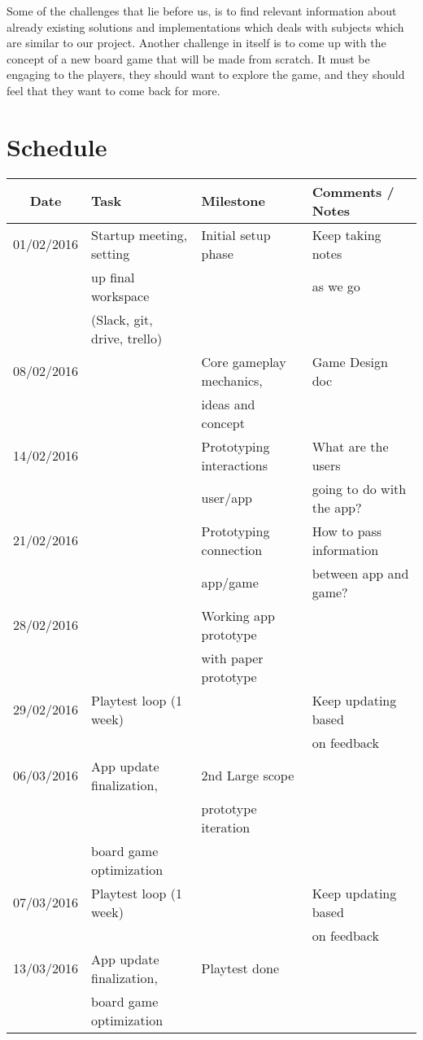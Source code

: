 \documentclass[a4paper,11pt]{article}
\begin{document}
Some of the challenges that lie before us, is to find relevant information about already existing solutions and implementations which deals with subjects which are similar to our project. 
Another challenge in itself is to come up with the concept of a new board game that will be made from scratch. It must be engaging to the players, they should want to explore the game, and they should feel that they want to come back for more.

\section{Schedule}
\begin{tabular}{|c|l|l|l|}
\hline
Date & Task & Milestone & Comments / Notes\\
\hline
01/02/2016 & Startup meeting, setting & Initial setup phase & Keep taking notes\\
& up final workspace &  &  as we go\\
& (Slack, git, drive, trello) & & \\
\hline
08/02/2016 & & Core gameplay mechanics,& Game Design doc \\
 & &  ideas and concept & \\
\hline
14/02/2016 & & Prototyping interactions & What are the users\\
& & user/app & going to do with the app?\\
\hline
21/02/2016 & & Prototyping connection & How to pass information \\ 
& & app/game & between app and game?\\
\hline
28/02/2016 & & Working app prototype& \\
& &  with paper prototype & \\
\hline
29/02/2016 & Playtest loop (1 week) & & Keep updating based \\	
& & & on feedback\\
\hline
06/03/2016 & App update finalization, & 2nd Large scope & \\
& &  prototype iteration & \\
 &  board game optimization & & \\
\hline
07/03/2016 & Playtest loop (1 week) &  & Keep updating based \\
& & & on feedback\\
\hline
13/03/2016 & App update finalization,& Playtest done & \\
&  board game optimization & & \\

\end{tabular}
\end{document}

